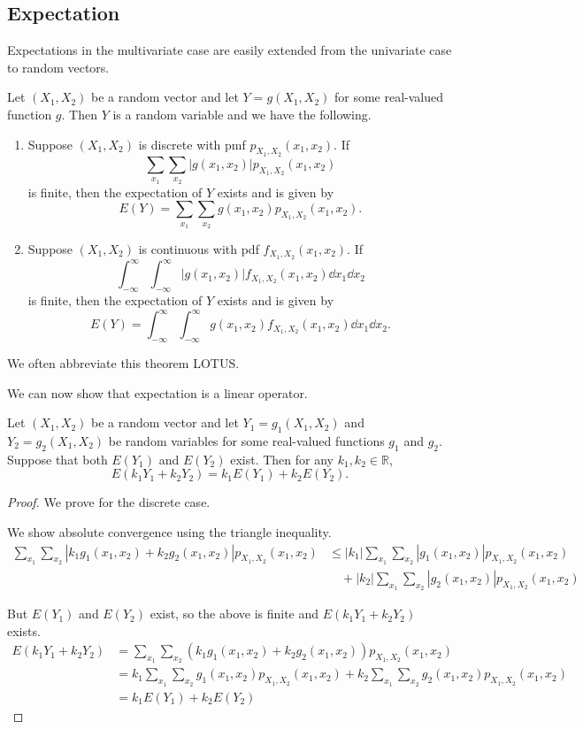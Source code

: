 \subsection{Expectation}

Expectations in the multivariate case are easily extended from the univariate case to random vectors.

\begin{theorem}\label{thm:lotus2}
	Let $(X_1,X_2)$ be a random vector and let $Y=g(X_1,X_2)$ for some real-valued function $g$. Then $Y$ is a random variable and we have the following.
	\begin{enumerate}[label=\color{main}(\alph*)]
		\item Suppose $(X_1,X_2)$ is discrete with pmf $p_{X_1,X_2}(x_1,x_2)$. If $$\sum_{x_1}\sum_{x_2}|g(x_1,x_2)|p_{X_1,X_2}(x_1,x_2)$$ is finite, then the expectation of $Y$ exists and is given by $$E(Y)=\sum_{x_1}\sum_{x_2}g(x_1,x_2)p_{X_1,X_2}(x_1,x_2).$$
		\item Suppose $(X_1,X_2)$ is continuous with pdf $f_{X_1,X_2}(x_1,x_2)$. If $$\int_{-\infty}^{\infty}\int_{-\infty}^{\infty}|g(x_1,x_2)|f_{X_1,X_2}(x_1,x_2)\dd{x_1}\dd{x_2}$$ is finite, then the expectation of $Y$ exists and is given by $$E(Y)=\int_{-\infty}^{\infty}\int_{-\infty}^{\infty}g(x_1,x_2)f_{X_1,X_2}(x_1,x_2)\dd{x_1}\dd{x_2}.$$
	\end{enumerate}
\end{theorem}

We often abbreviate this theorem LOTUS.

We can now show that expectation is a linear operator.

\begin{theorem}
	Let $(X_1,X_2)$ be a random vector and let $Y_1=g_1(X_1,X_2)$ and $Y_2=g_2(X_1,X_2)$ be random variables for some real-valued functions $g_1$ and $g_2$. Suppose that both $E(Y_1)$ and $E(Y_2)$ exist. Then for any $k_1,k_2\in\mathbb R$,
	$$E(k_1Y_1+k_2Y_2)=k_1E(Y_1)+k_2E(Y_2).$$
\end{theorem}

\begin{proof}
	We prove for the discrete case.

	We show absolute convergence using the triangle inequality.
	\begin{align*}
		\sum_{x_1}\sum_{x_2}|k_1g_1(x_1,x_2)+k_2g_2(x_1,x_2)|p_{X_1,X_2}(x_1,x_2)&\leq |k_1|\sum_{x_1}\sum_{x_2}|g_1(x_1,x_2)|p_{X_1,X_2}(x_1,x_2)\\
		&\quad+|k_2|\sum_{x_1}\sum_{x_2}|g_2(x_1,x_2)|p_{X_1,X_2}(x_1,x_2)
	\end{align*}

	But $E(Y_1)$ and $E(Y_2)$ exist, so the above is finite and $E(k_1Y_1+k_2Y_2)$ exists.
	\begin{align*}
		E(k_1Y_1+k_2Y_2)&=\sum_{x_1}\sum_{x_2}(k_1g_1(x_1,x_2)+k_2g_2(x_1,x_2))p_{X_1,X_2}(x_1,x_2)\\
		&=k_1\sum_{x_1}\sum_{x_2}g_1(x_1,x_2)p_{X_1,X_2}(x_1,x_2)+k_2\sum_{x_1}\sum_{x_2}g_2(x_1,x_2)p_{X_1,X_2}(x_1,x_2)\\
		&=k_1E(Y_1)+k_2E(Y_2)
	\end{align*}
\end{proof}

